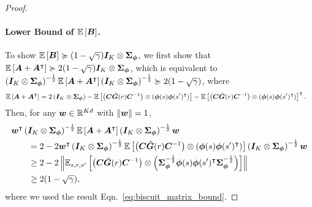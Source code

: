 \begin{proof}
\paragraph{Lower Bound of ${\mathbb E}\left[{{\bm{B}}}\right]$.}
To show ${\mathbb E}\left[{{\bm{B}}}\right]\succcurlyeq (1-\sqrt\gamma){\bm{I}}_K\otimes{\bm{\Sigma}}_{{\bm{\phi}}}$, we first show that ${\mathbb E}\left[{{\bm{A}}+{\bm{A}}^{\intercal}}\right]\succcurlyeq 2(1-\sqrt\gamma){\bm{I}}_K\otimes{\bm{\Sigma}}_{{\bm{\phi}}}$, which is equivalent to $\left({{\bm{I}}_K\otimes{\bm{\Sigma}}_{{\bm{\phi}}}}\right)^{-\frac{1}{2}}{\mathbb E}\left[{{\bm{A}}+{\bm{A}}^{\intercal}}\right]\left({{\bm{I}}_K\otimes{\bm{\Sigma}}_{{\bm{\phi}}}}\right)^{-\frac{1}{2}}\succcurlyeq 2(1-\sqrt\gamma)$, where
\begin{equation*}
\begin{aligned}
    {\mathbb E}\left[{{\bm{A}}+{\bm{A}}^{\intercal}}\right]&=2\left({{\bm{I}}_K\otimes{\bm{\Sigma}}_{{\bm{\phi}}} }\right)-{\mathbb E}\left[{\left({{\bm{C}}\tilde{{\bm{G}}}(r){\bm{C}}^{-1}}\right)\otimes\left({{\bm{\phi}}(s){\bm{\phi}}(s^\prime)^{\intercal}}\right)}\right]-{\mathbb E}\left[{\left({{\bm{C}}\tilde{{\bm{G}}}(r){\bm{C}}^{-1}}\right)\otimes\left({{\bm{\phi}}(s){\bm{\phi}}(s^\prime)^{\intercal}}\right)}\right]^{\intercal}.
\end{aligned}
\end{equation*}
Then, for any ${\bm{w}}\in{\mathbb R}^{Kd}$ with $\left\|{{\bm{w}}}\right\|=1$, 
    \begin{equation*}
\begin{aligned}
        &{\bm{w}}^{\intercal}\left({{\bm{I}}_K\otimes{\bm{\Sigma}}_{{\bm{\phi}}}}\right)^{-\frac{1}{2}}{\mathbb E}\left[{{\bm{A}}+{\bm{A}}^{\intercal}}\right]\left({{\bm{I}}_K\otimes{\bm{\Sigma}}_{{\bm{\phi}}}}\right)^{-\frac{1}{2}}{\bm{w}}\\
        &\qquad=2-2{\bm{w}}^{\intercal}\left({{\bm{I}}_K\otimes{\bm{\Sigma}}_{{\bm{\phi}}}}\right)^{-\frac{1}{2}}{\mathbb E}\left[{\left({{\bm{C}}\tilde{{\bm{G}}}(r){\bm{C}}^{-1}}\right)\otimes\left({{\bm{\phi}}(s){\bm{\phi}}(s^\prime)^{\intercal}}\right)}\right]\left({{\bm{I}}_K\otimes{\bm{\Sigma}}_{{\bm{\phi}}}}\right)^{-\frac{1}{2}}  {\bm{w}}\\
        &\qquad\geq 2-2\left\|{{\mathbb E}_{s, r, s^\prime}\left[{\left({{\bm{C}}\tilde{{\bm{G}}}(r){\bm{C}}^{-1}}\right)\otimes\left({{\bm{\Sigma}}_{{\bm{\phi}}}^{-\frac{1}{2}}{\bm{\phi}}(s){\bm{\phi}}(s^\prime)^{\intercal}{\bm{\Sigma}}_{{\bm{\phi}}}^{-\frac{1}{2}}}\right)}\right]}\right\|\\
        &\qquad \geq 2(1-\sqrt\gamma),
\end{aligned}
\end{equation*}
where we used the result Eqn.~\eqref{eq:biscuit_matrix_bound}.


\end{proof}
